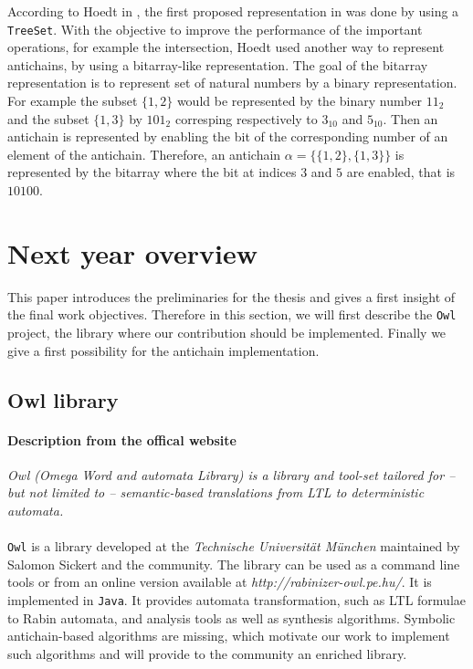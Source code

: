 \documentclass[11pt,a4paper]{article}
\theoremstyle{definition}
\begin{document}
According to Hoedt in
\cite{hoedt}, the first proposed representation
in \cite{causemaecker1} was done by using
a \texttt{TreeSet}. With the objective to improve the performance of
the important operations, for example the intersection, Hoedt used
another way to represent antichains, by using a bitarray-like representation.
The goal of the bitarray representation is to represent set of natural numbers
by a binary representation. For example the subset $\{1, 2\}$ would be
represented by the binary number $11_2$ and the subset $\{1, 3\}$
by $101_2$ corresping respectively to $3_{10}$ and $5_{10}$. Then an antichain
is represented by enabling the bit of the corresponding number of an element
of the antichain. Therefore, an antichain $\alpha = \{\{1, 2\}, \{1, 3\}\}$
is represented by the bitarray  where the bit at indices $3$ and $5$
are enabled, that is $10100$.

\newpage

\section{Next year overview}

\label{conclusion}

This paper introduces the preliminaries for the thesis
and gives a first insight of the final
work objectives. Therefore in this section, we will first describe
the \texttt{Owl} project, the library where our contribution should
be implemented. Finally we give a first possibility for the
antichain implementation.

\subsection{Owl library}

\label{sec:owl}

\paragraph{Description from the offical website \cite{owl}}
\textit{Owl (Omega Word and automata Library)
is a library and tool-set tailored for – but not
limited to – semantic-based translations
from LTL to deterministic automata.}

\paragraph{}

\texttt{Owl} is a library developed at the
\textit{Technische Universität München}
maintained by Salomon Sickert and the community.
The library can be used as a command line tools or from an
online version available at \textit{http://rabinizer-owl.pe.hu/}.
It is implemented in \texttt{Java}.
It provides automata transformation, such as LTL formulae
to Rabin automata, and analysis
tools as well as synthesis algorithms.
Symbolic antichain-based algorithms are missing, which motivate
our work to implement such algorithms and will provide
to the community an enriched library.
\end{document}
